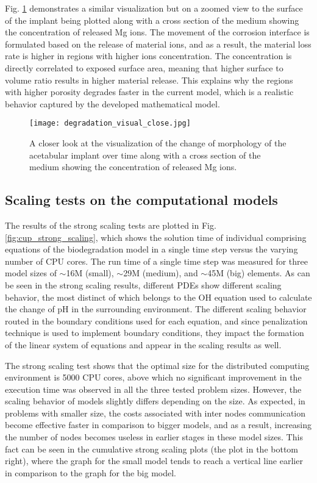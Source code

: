Fig. \ref{fig:cup_degradation_visual_close} demonstrates a similar visualization but on a zoomed view to the surface of the implant being plotted along with a cross section of the medium showing the concentration of released Mg ions. The movement of the corrosion interface is formulated based on the release of material ions, and as a result, the material loss rate is higher in regions with higher ions concentration. The  concentration is directly correlated to exposed surface area, meaning that higher surface to volume ratio results in higher material release. This explains why the regions with higher porosity degrades faster in the current model, which is a realistic behavior captured by the developed mathematical model. 

\begin{figure}[h]
\centering
\medskip
\texttt{[image: degradation\_visual\_close.jpg]}
\caption[Visualization of the change of morphology of the acetabular implant]{A closer look at the visualization of the change of morphology of the acetabular implant over time along with a cross section of the medium showing the concentration of released Mg ions.} \label{fig:cup_degradation_visual_close}
\end{figure}

\subsection{Scaling tests on the computational models}

The results of the strong scaling tests are plotted in Fig. \ref{fig:cup_strong_scaling}, which shows the solution time of individual comprising equations of the biodegradation model in a single time step versus the varying number of CPU cores. The run time of a single time step was measured for three model sizes of $\sim$16M (small), $\sim$29M (medium), and $\sim$45M (big) elements. As can be seen in the strong scaling results, different PDEs show different scaling behavior, the most distinct of which belongs to the OH equation used to calculate the change of pH in the surrounding environment. The different scaling behavior routed in the boundary conditions used for each equation, and since penalization technique is used to implement boundary conditions, they impact the formation of the linear system of equations and appear in the scaling results as well.

The strong scaling test shows that the optimal size for the distributed computing environment is \num{5000} CPU cores, above which no significant improvement in the execution time was observed in all the three tested problem sizes. However, the scaling behavior of models slightly differs depending on the size. As expected, in problems with smaller size, the costs associated with inter nodes communication become effective faster in comparison to bigger models, and as a result, increasing the number of nodes becomes useless in earlier stages in these model sizes. This fact can be seen in the cumulative strong scaling plots (the plot in the bottom right), where the graph for the small model tends to reach a vertical line earlier in comparison to the graph for the big model.

